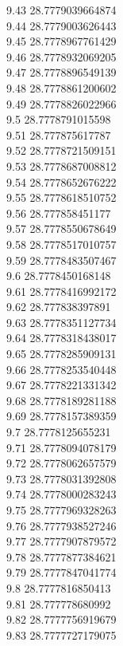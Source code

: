 {9.43	28.7779039664874\\
9.44	28.7779003626443\\
9.45	28.7778967761429\\
9.46	28.7778932069205\\
9.47	28.7778896549139\\
9.48	28.7778861200602\\
9.49	28.7778826022966\\
9.5	28.7778791015598\\
9.51	28.777875617787\\
9.52	28.7778721509151\\
9.53	28.7778687008812\\
9.54	28.7778652676222\\
9.55	28.7778618510752\\
9.56	28.777858451177\\
9.57	28.7778550678649\\
9.58	28.7778517010757\\
9.59	28.7778483507467\\
9.6	28.7778450168148\\
9.61	28.7778416992172\\
9.62	28.777838397891\\
9.63	28.7778351127734\\
9.64	28.7778318438017\\
9.65	28.7778285909131\\
9.66	28.7778253540448\\
9.67	28.7778221331342\\
9.68	28.7778189281188\\
9.69	28.7778157389359\\
9.7	28.7778125655231\\
9.71	28.7778094078179\\
9.72	28.7778062657579\\
9.73	28.7778031392808\\
9.74	28.7778000283243\\
9.75	28.7777969328263\\
9.76	28.7777938527246\\
9.77	28.7777907879572\\
9.78	28.7777877384621\\
9.79	28.7777847041774\\
9.8	28.7777816850413\\
9.81	28.777778680992\\
9.82	28.7777756919679\\
9.83	28.7777727179075\\
}
